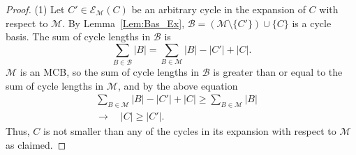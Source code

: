 \documentclass[10pt,a4paper]{amsart}
\newcommand\calB{\mathcal{B}}
\newcommand\calM{\mathcal{M}}
\newcommand\expand[2]{\mathcal{E}_{#1}\left(#2\right)}   %
\begin{document}
\begin{proof}
	(1) Let $C'\in\expand{\calM}{C}$ be an arbitrary cycle in the expansion of $C$ with respect to $\calM$. By Lemma~\ref{Lem:Bas_Ex}, $\calB=(\calM\setminus \{C'\})\cup\{C\}$ is a cycle basis. The sum of cycle lengths in $\calB$ is
	\begin{equation}
		\sum_{B\in\calB} |B| = \sum_{B\in\calM} |B| - |C'| + |C|.
	\end{equation}
	$\calM$ is an MCB, so the sum of cycle lengths in $\calB$ is greater than or equal to the sum of cycle lengths in $\calM$, and by the above equation
	\begin{equation}
		\begin{split}
		\sum_{B\in\calM} |B| - |C'| + |C| \ge \sum_{B\in\calM} |B| \quad \\\longrightarrow \quad |C| \ge |C'|.
		\end{split}
	\end{equation}
	Thus, $C$ is not smaller than any of the cycles in its expansion with respect to $\calM$ as claimed.
	

\end{proof}
\end{document}
